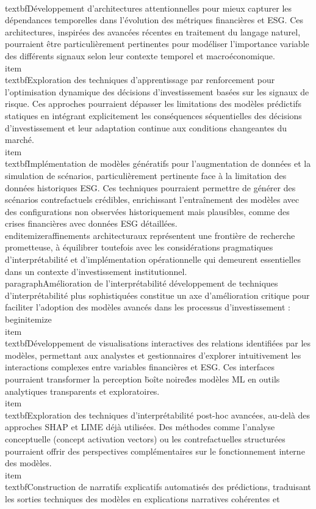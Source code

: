 \\textbf{Développement d'architectures attentionnelles} pour mieux capturer les dépendances temporelles dans l'évolution des métriques financières et ESG. Ces architectures, inspirées des avancées récentes en traitement du langage naturel, pourraient être particulièrement pertinentes pour modéliser l'importance variable des différents signaux selon leur contexte temporel et macroéconomique.\n    \n    \\item \\textbf{Exploration des techniques d'apprentissage par renforcement} pour l'optimisation dynamique des décisions d'investissement basées sur les signaux de risque. Ces approches pourraient dépasser les limitations des modèles prédictifs statiques en intégrant explicitement les conséquences séquentielles des décisions d'investissement et leur adaptation continue aux conditions changeantes du marché.\n    \n    \\item \\textbf{Implémentation de modèles génératifs} pour l'augmentation de données et la simulation de scénarios, particulièrement pertinente face à la limitation des données historiques ESG. Ces techniques pourraient permettre de générer des scénarios contrefactuels crédibles, enrichissant l'entraînement des modèles avec des configurations non observées historiquement mais plausibles, comme des crises financières avec données ESG détaillées.\n\\end{itemize}\n\nCes raffinements architecturaux représentent une frontière de recherche prometteuse, à équilibrer toutefois avec les considérations pragmatiques d'interprétabilité et d'implémentation opérationnelle qui demeurent essentielles dans un contexte d'investissement institutionnel.\n\n\\paragraph{Amélioration de l'interprétabilité} \n\nLe développement de techniques d'interprétabilité plus sophistiquées constitue un axe d'amélioration critique pour faciliter l'adoption des modèles avancés dans les processus d'investissement :\n\\begin{itemize}\n    \\item \\textbf{Développement de visualisations interactives} des relations identifiées par les modèles, permettant aux analystes et gestionnaires d'explorer intuitivement les interactions complexes entre variables financières et ESG. Ces interfaces pourraient transformer la perception \"boîte noire\" des modèles ML en outils analytiques transparents et exploratoires.\n    \n    \\item \\textbf{Exploration des techniques d'interprétabilité post-hoc avancées}, au-delà des approches SHAP et LIME déjà utilisées. Des méthodes comme l'analyse conceptuelle (concept activation vectors) ou les contrefactuelles structurées pourraient offrir des perspectives complémentaires sur le fonctionnement interne des modèles.\n    \n    \\item \\textbf{Construction de narratifs explicatifs automatisés} des prédictions, traduisant les sorties techniques des modèles en explications narratives cohérentes et 